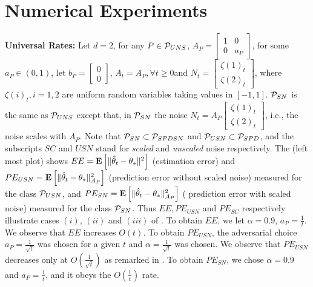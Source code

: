 \section{Numerical Experiments}\label{sec:exp}

\textbf{Universal Rates:} Let $d=2$, for any $P\in \P_{UNS}$, $A_P=\left[\begin{matrix}1 &0\\ 0 & a_P\end{matrix}\right]$, for some $a_P\in (0,1)$, let $b_P=\left[\begin{matrix}0\\0\end{matrix}\right]$, $A_t=A_P,\forall t\geq 0$and $N_t=\left[\begin{matrix}\zeta(1)_t\\ \zeta(2)_t\end{matrix}\right]$, where $\zeta(i)_t, i=1,2$ are \iid uniform random variables taking values in $[-1,1]$. $\P_{SN}$ is the same as $\P_{UNS}$ except that, in $\P_{SN}$ the noise $N_t=A_P \left[\begin{matrix}\zeta(1)_t\\ \zeta(2)_t\end{matrix}\right]$, i.e., the noise scales with $A_P$. Note that $\P_{SN}\subset \P_{SPDSN}$ and $\P_{USN}\subset \P_{SPD}$, and the subscripts $SC$ and $USN$ stand for \emph{scaled} and \emph{unscaled} noise respectively. 
The  (left most plot) shows $EE=\EE{\normsm{\thh_t-\ts}^2}$ (estimation error) and $PE_{USN}=\EE{\normsm{\thh_t-\ts}^2_{A_P}}$ (prediction error without scaled noise) measured for the class $\P_{USN}$,  and $PE_{SN}=\EE{\normsm{\thh_t-\ts}^2_{A_P}}$ ( prediction error with scaled noise)  measured for the class $\P_{SN}$. Thus $EE, PE_{USN}$ and $PE_{SC}$ respectively illustrate cases $(i)$, $(ii)$ and $(iii)$ of . To obtain $EE$, we let $\alpha=0.9$, $a_P=\frac{1}{t}$. We observe that $EE$ increases $O(t)$. To obtain $PE_{USN}$, the adversarial choice $a_P=\frac{1}{\sqrt{t}}$ was chosen for a given $t$ and $\alpha=\frac{1}{\sqrt{t}}$ was chosen. We observe that $PE_{USN}$ decreases only at $O(\frac{1}{\sqrt{t}})$ as remarked in . To obtain $PE_{SN}$, we chose $\alpha=0.9$ and $a_P=\frac{1}{t}$, and it obeys the $O(\frac{1}{t})$ rate.

